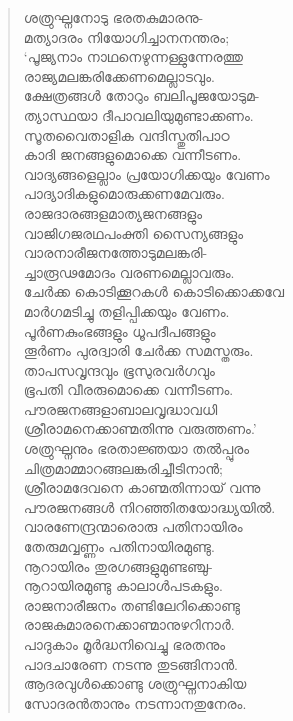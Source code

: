 \begin{verse}
ശത്രുഘ്നനോടു ഭരതകുമാരനു-\\
മത്യാദരം നിയോഗിച്ചാനനന്തരം;\\
‘പൂജ്യനാം നാഥനെഴുന്നള്ളുന്നേരത്തു\\
രാജ്യമലങ്കരിക്കേണമെല്ലാടവും.\\
ക്ഷേത്രങ്ങള്‍ തോറും ബലിപൂജയോടുമ-\\
ത്യാസ്ഥയാ ദീപാവലിയുമുണ്ടാക്കണം.\\
സൂതവൈതാളിക വന്ദിസ്തുതിപാഠ\\
കാദി ജനങ്ങളുമൊക്കെ വന്നീടണം.\\
വാദ്യങ്ങളെല്ലാം പ്രയോഗിക്കയും വേണം\\
പാദ്യാദികളുമൊരുക്കണമേവരും.\\
രാജദാരങ്ങളമാത്യജനങ്ങളും\\
വാജിഗജരഥപംക്തി സൈന്യങ്ങളും\\
വാരനാരീജനത്തോടുമലങ്കരി-\\
ച്ചാരൂഢമോദം വരണമെല്ലാവരും.\\
ചേര്‍ക്ക കൊടിക്കൂറകള്‍ കൊടിക്കൊക്കവേ\\
മാര്‍ഗമടിച്ചു തളിപ്പിക്കയും വേണം.\\
പൂര്‍ണകുംഭങ്ങളും ധൂപദീപങ്ങളും\\
തൂര്‍ണം പുരദ്വാരി ചേര്‍ക്ക സമസ്തരും.\\
താപസവൃന്ദവും ഭൂസുരവര്‍ഗവും\\
ഭൂപതി വീരരുമൊക്കെ വന്നീടണം.\\
പൗരജനങ്ങളാബാലവൃദ്ധാവധി\\
ശ്രീരാമനെക്കാണ്മതിന്നു വരുത്തണം.’\\
ശത്രുഘ്നനും ഭരതാജ്ഞയാ തല്‍പ്പുരം\\
ചിത്രമാമ്മാറങ്ങലങ്കരിച്ചീടിനാന്‍;\\
ശ്രീരാമദേവനെ കാണ്മതിന്നായ് വന്നു\\
പൗരജനങ്ങള്‍ നിറഞ്ഞിതയോദ്ധ്യയില്‍.\\
വാരണേന്ദ്രന്മാരൊരു പതിനായിരം\\
തേരുമവ്വണ്ണം പതിനായിരമുണ്ടു.\\
നൂറായിരം തുരഗങ്ങളുമുണ്ടഞ്ചു-\\
നൂറായിരമുണ്ടു കാലാള്‍പടകളും.\\
രാജനാരീജനം തണ്ടിലേറിക്കൊണ്ടു\\
രാജകുമാരനെക്കാണ്മാനുഴറിനാര്‍.\\
പാദുകാം മൂര്‍ദ്ധനിവെച്ചു ഭരതനും\\
പാദചാരേണ നടന്നു തുടങ്ങിനാന്‍.\\
ആദരവുള്‍ക്കൊണ്ടു ശത്രുഘ്നനാകിയ\\
സോദരന്‍താനും നടന്നാനതുനേരം.\\

\end{verse}
